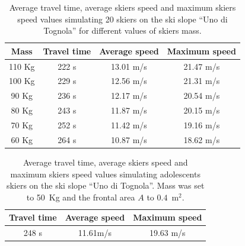 \documentclass[12pt,a4paper,twoside]{book}
\begin{document}
\begin{table}[!t]
  \centering
  \begin{tabular}{ | c | c | c | c | }
    \hline
    Mass & Travel time & Average speed & Maximum speed \\
    \hline
    110 Kg & 222 s & 13.01 m/s & 21.47 m/s \\
    \hline
    100 Kg & 229 s & 12.56 m/s & 21.31 m/s \\
    \hline
    90 Kg & 236 s & 12.17 m/s & 20.54 m/s \\
    \hline
    80 Kg & 243 s & 11.87 m/s & 20.15 m/s \\
    \hline
    70 Kg & 252 s & 11.42 m/s & 19.16 m/s \\
    \hline
    60 Kg & 264 s & 10.87 m/s & 18.62 m/s \\
    \hline
  \end{tabular}
  \caption{Average travel time, average skiers speed and maximum skiers speed values simulating 20 skiers on the ski slope ``Uno di Tognola'' for different values of skiers mass.}
\end{table}
\begin{table}[!h]
  \centering
  \begin{tabular}{ | c | c | c | }
    \hline
    Travel time & Average speed & Maximum speed \\
    \hline
    248 s & 11.61m/s & 19.63 m/s \\
    \hline
  \end{tabular}
  \caption{Average travel time, average skiers speed and maximum skiers speed values simulating adolescents skiers on the ski slope ``Uno di Tognola''. Mass was set to 50~Kg and the frontal area $A$ to $0.4$~m$^2$.}
\end{table}
\end{document}
